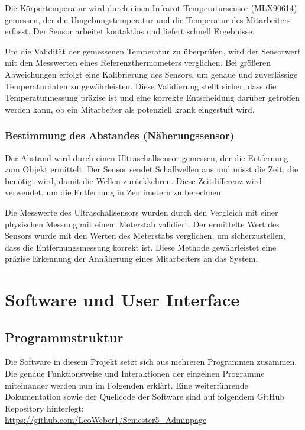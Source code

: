 Die Körpertemperatur wird durch einen Infrarot-Temperatursensor (MLX90614) gemessen, der die Umgebungstemperatur und die Temperatur des Mitarbeiters erfasst. Der Sensor arbeitet kontaktlos und liefert schnell Ergebnisse.

\vspace{1em}
\noindent Um die Validität der gemessenen Temperatur zu überprüfen, wird der Sensorwert mit den Messwerten eines Referenzthermometers verglichen. Bei größeren Abweichungen erfolgt eine Kalibrierung des Sensors, um genaue und zuverlässige Temperaturdaten zu gewährleisten. Diese Validierung stellt sicher, dass die Temperaturmessung präzise ist und eine korrekte Entscheidung darüber getroffen werden kann, ob ein Mitarbeiter als potenziell krank eingestuft wird.

\subsubsection{Bestimmung des Abstandes (Näherungssensor)}

Der Abstand wird durch einen Ultraschallsensor gemessen, der die Entfernung zum Objekt ermittelt. Der Sensor sendet Schallwellen aus und misst die Zeit, die benötigt wird, damit die Wellen zurückkehren. Diese Zeitdifferenz wird verwendet, um die Entfernung in Zentimetern zu berechnen.

\vspace{1em}
\noindent Die Messwerte des Ultraschallsensors wurden durch den Vergleich mit einer physischen Messung mit einem Meterstab validiert. Der ermittelte Wert des Sensors wurde mit den Werten des Meterstabs verglichen, um sicherzustellen, dass die Entfernungsmessung korrekt ist. Diese Methode gewährleistet eine präzise Erkennung der Annäherung eines Mitarbeiters an das System.


\section{Software und User Interface}\label{sec:software_und_user_interface}

\subsection{Programmstruktur}\label{subsec:programmstruktur}

Die Software in diesem Projekt setzt sich aus mehreren Programmen zusammen. Die genaue Funktionsweise und Interaktionen der einzelnen Programme miteinander werden nun im Folgenden erklärt. Eine weiterführende Dokumentation sowie der Quellcode der Software sind auf folgendem GitHub Repository hinterlegt:\\ \url{https://github.com/LeoWeber1/Semester5_Adminpage}



